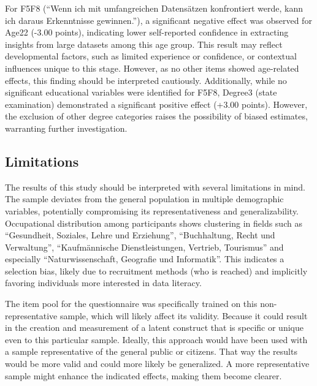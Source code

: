 \documentclass[
  12pt,
  a4paper,
  twoside]{article}
\begin{document}
For F5F8 (``Wenn ich mit umfangreichen Datensätzen konfrontiert werde, kann ich daraus Erkenntnisse gewinnen.''), a significant negative effect was observed for Age22 (-3.00 points), indicating lower self-reported confidence in extracting insights from large datasets among this age group. This result may reflect developmental factors, such as limited experience or confidence, or contextual influences unique to this stage. However, as no other items showed age-related effects, this finding should be interpreted cautiously. Additionally, while no significant educational variables were identified for F5F8, Degree3 (state examination) demonstrated a significant positive effect (+3.00 points). However, the exclusion of other degree categories raises the possibility of biased estimates, warranting further investigation.

\subsection{Limitations}\label{limitations}

The results of this study should be interpreted with several limitations in mind. The sample deviates from the general population in multiple demographic variables, potentially compromising its representativeness and generalizability. Occupational distribution among participants shows clustering in fields such as ``Gesundheit, Soziales, Lehre und Erziehung'', ``Buchhaltung, Recht und Verwaltung'', ``Kaufmännische Dienstleistungen, Vertrieb, Tourismus'' and especially ``Naturwissenschaft, Geografie und Informatik''. This indicates a selection bias, likely due to recruitment methods (who is reached) and implicitly favoring individuals more interested in data literacy.

The item pool for the questionnaire was specifically trained on this non-representative sample, which will likely affect its validity.
Because it could result in the creation and measurement of a latent construct that is specific or unique even to this particular sample.
Ideally, this approach would have been used with a sample representative of the general public or citizens.
That way the results would be more valid and could more likely be generalized.
A more representative sample might enhance the indicated effects, making them become clearer.
\end{document}
